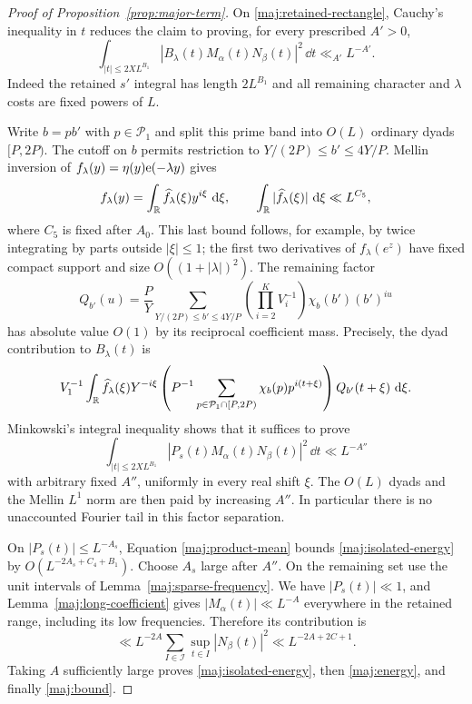 \begin{proof}[Proof of Proposition~\ref{prop:major-term}]
On \eqref{maj:retained-rectangle}, Cauchy's inequality in $t$
reduces the claim to proving, for every prescribed $A'>0$,
\begin{equation}\label{maj:energy}
 \int_{|t|\le2XL^{B_1}}
       |B_\lambda(t)M_\alpha(t)N_\beta(t)|^2\,\dd t
       \ll_{A'}L^{-A'}.
\end{equation}
Indeed the retained $s'$ integral has length $2L^{B_1}$ and all
remaining character and $\lambda$ costs are fixed powers of $L$.

Write $b=pb'$ with $p\in\mathcal P_1$ and split this prime band
into $O(L)$ ordinary dyads $[P,2P)$.  The cutoff on $b$ permits
restriction to $Y/(2P)\le b'\le4Y/P$.  Mellin inversion of
$f_\lambda(y)=\eta(y)\mathrm{e}(-\lambda y)$ gives
\[
 f_\lambda(y)=\int_\mathbb R\widehat f_\lambda(\xi)y^{i\xi}\,\,\mathrm d\xi,
 \qquad \int_\mathbb R|\widehat f_\lambda(\xi)|\,\,\mathrm d\xi
                \ll L^{C_5},
\]
where $C_5$ is fixed after $A_0$.  This last bound follows, for
example, by twice integrating by parts outside $|\xi|\le1$;
the first two derivatives of $f_\lambda(e^z)$ have fixed compact
support and size $O((1+|\lambda|)^2)$.
The remaining factor
\[
 Q_{b'}(u)=\frac P Y\sum_{Y/(2P)\le b'\le4Y/P}
      \left(\prod_{i=2}^KV_i^{-1}\right)\chi_b(b')(b')^{iu}
\]
has absolute value $O(1)$ by its reciprocal coefficient mass.
Precisely, the dyad contribution to $B_\lambda(t)$ is
\[
 V_1^{-1}\int_\mathbb R\widehat f_\lambda(\xi)Y^{-i\xi}
     \left(P^{-1}\sum_{p\in\mathcal P_1\cap[P,2P)}
                         \chi_b(p)p^{i(t+\xi)}\right)
                  Q_{b'}(t+\xi)\,\,\mathrm d\xi.
\]
Minkowski's integral inequality shows that it suffices to prove
\begin{equation}\label{maj:isolated-energy}
 \int_{|t|\le2XL^{B_1}}
       |P_s(t)M_\alpha(t)N_\beta(t)|^2\,\dd t\ll L^{-A''}
\end{equation}
with arbitrary fixed $A''$, uniformly in every real shift $\xi$.
The $O(L)$ dyads and the Mellin $L^1$ norm are then paid by
increasing $A''$.  In particular there is no unaccounted Fourier
tail in this factor separation.

On $|P_s(t)|\le L^{-A_s}$, Equation \eqref{maj:product-mean}
bounds \eqref{maj:isolated-energy} by
$O(L^{-2A_s+C_4+B_1})$.  Choose $A_s$ large after $A''$.
On the remaining set use the unit intervals of
Lemma~\ref{maj:sparse-frequency}.  We have $|P_s(t)|\ll1$, and
Lemma~\ref{maj:long-coefficient} gives
$|M_\alpha(t)|\ll L^{-A}$ everywhere in the retained range,
including its low frequencies.  Therefore its contribution is
\[
 \ll L^{-2A}
       \sum_{I\in\mathcal I}\sup_{t\in I}|N_\beta(t)|^2
 \ll L^{-2A+2C+1}.
\]
Taking $A$ sufficiently large proves
\eqref{maj:isolated-energy}, then \eqref{maj:energy}, and finally
\eqref{maj:bound}.
\end{proof}

